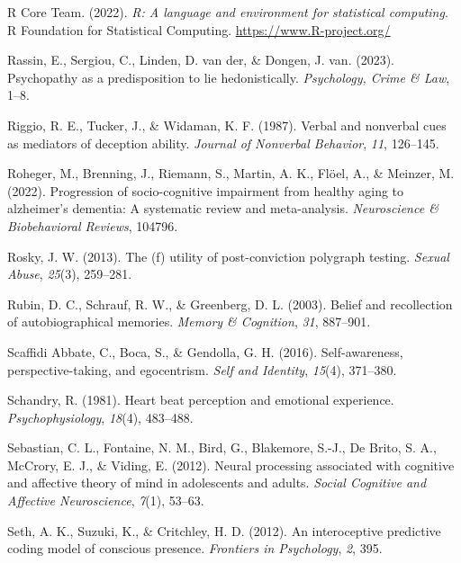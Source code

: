 \documentclass[
  man,mask,floatsintext]{apa6}
\newlength{\cslhangindent}
\newlength{\cslentryspacingunit} %
\newenvironment{CSLReferences}[2] %
 {%
  \setlength{\parindent}{0pt}
  \ifodd #1
  \let\oldpar\par
  \def\par{\hangindent=\cslhangindent\oldpar}
  \fi
  \setlength{\parskip}{#2\cslentryspacingunit}
 }%
 {}
\begin{document}
\begin{CSLReferences}{1}{0}
\leavevmode{}%
R Core Team. (2022). \emph{R: A language and environment for statistical computing}. R Foundation for Statistical Computing. \url{https://www.R-project.org/}

\leavevmode{}%
Rassin, E., Sergiou, C., Linden, D. van der, \& Dongen, J. van. (2023). Psychopathy as a predisposition to lie hedonistically. \emph{Psychology, Crime \& Law}, 1--8.

\leavevmode{}%
Riggio, R. E., Tucker, J., \& Widaman, K. F. (1987). Verbal and nonverbal cues as mediators of deception ability. \emph{Journal of Nonverbal Behavior}, \emph{11}, 126--145.

\leavevmode{}%
Roheger, M., Brenning, J., Riemann, S., Martin, A. K., Flöel, A., \& Meinzer, M. (2022). Progression of socio-cognitive impairment from healthy aging to alzheimer's dementia: A systematic review and meta-analysis. \emph{Neuroscience \& Biobehavioral Reviews}, 104796.

\leavevmode{}%
Rosky, J. W. (2013). The (f) utility of post-conviction polygraph testing. \emph{Sexual Abuse}, \emph{25}(3), 259--281.

\leavevmode{}%
Rubin, D. C., Schrauf, R. W., \& Greenberg, D. L. (2003). Belief and recollection of autobiographical memories. \emph{Memory \& Cognition}, \emph{31}, 887--901.

\leavevmode{}%
Scaffidi Abbate, C., Boca, S., \& Gendolla, G. H. (2016). Self-awareness, perspective-taking, and egocentrism. \emph{Self and Identity}, \emph{15}(4), 371--380.

\leavevmode{}%
Schandry, R. (1981). Heart beat perception and emotional experience. \emph{Psychophysiology}, \emph{18}(4), 483--488.

\leavevmode{}%
Sebastian, C. L., Fontaine, N. M., Bird, G., Blakemore, S.-J., De Brito, S. A., McCrory, E. J., \& Viding, E. (2012). Neural processing associated with cognitive and affective theory of mind in adolescents and adults. \emph{Social Cognitive and Affective Neuroscience}, \emph{7}(1), 53--63.

\leavevmode{}%
Seth, A. K., Suzuki, K., \& Critchley, H. D. (2012). An interoceptive predictive coding model of conscious presence. \emph{Frontiers in Psychology}, \emph{2}, 395.


\end{CSLReferences}
\end{document}
